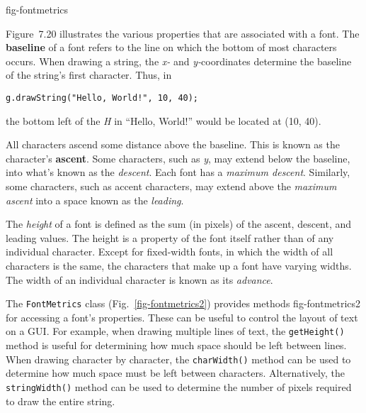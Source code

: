 {fig-fontmetrics}

Figure~7.20 illustrates the various properties that
are associated with a font.   The {\bf baseline} of a font refers to
the line on which the bottom of most characters occurs.  When drawing a
string, the {\it x-} and {\it y-}coordinates determine the baseline of
the string's first character.  Thus, in

\begin{jjjlisting}
\begin{lstlisting}
g.drawString("Hello, World!", 10, 40);
\end{lstlisting}
\end{jjjlisting}

\noindent the bottom left of the {\it H} in ``Hello, World!'' would be
located at (10, 40).

All characters ascend some distance above the baseline.  This is known
as the character's {\bf ascent}.  Some characters, such as {\it y},
may extend below the baseline, into what's known as the {\it
descent}. Each font has a {\it maximum descent}.  Similarly, some
characters, such as accent characters, may extend above the {\it
maximum ascent} into a space known as the {\it leading}.

The {\it height} of a font is defined as the sum (in pixels) of the
ascent, descent, and leading values.  The height is a property of the
font itself rather than of any individual character.   Except for
fixed-width fonts, in which the width of all characters is the same,
the characters that make up a font have varying widths.  The width of
an individual character is known as its {\it advance}.



The {\tt FontMetrics} class (Fig.~\ref{fig-fontmetrics2}) provides methods
{fig-fontmetrics2}
for accessing a font's properties.  These can be useful to control the
layout of text on a GUI.  For example, when drawing multiple lines of
text, the {\tt getHeight()} method is useful for determining how much
space should be left between lines.  When drawing character by
character, the {\tt charWidth()} method can be used to determine how
much space must be left between characters.  Alternatively, the {\tt
stringWidth()} method can be used to determine the number of pixels
required to draw the entire string.

